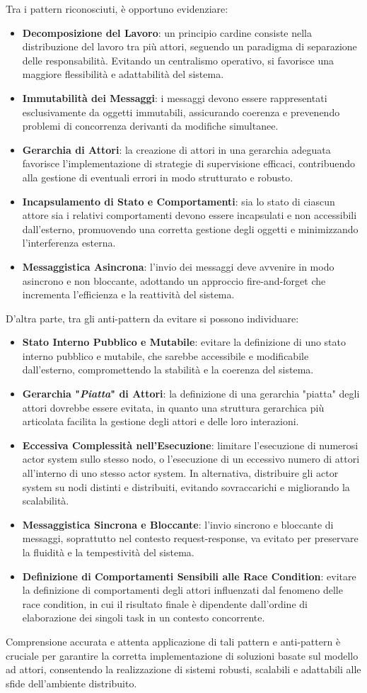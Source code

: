 Tra i pattern riconosciuti, è opportuno evidenziare:
\begin{itemize}
  \item \textbf{Decomposizione del Lavoro}: un principio cardine consiste nella distribuzione del lavoro tra più attori, seguendo un paradigma di separazione delle responsabilità. Evitando un centralismo operativo, si favorisce una maggiore flessibilità e adattabilità del sistema.
  \item \textbf{Immutabilità dei Messaggi}: i messaggi devono essere rappresentati esclusivamente da oggetti immutabili, assicurando coerenza e prevenendo problemi di concorrenza derivanti da modifiche simultanee.
  \item \textbf{Gerarchia di Attori}: la creazione di attori in una gerarchia adeguata favorisce l'implementazione di strategie di supervisione efficaci, contribuendo alla gestione di eventuali errori in modo strutturato e robusto.
  \item \textbf{Incapsulamento di Stato e Comportamenti}: sia lo stato di ciascun attore sia i relativi comportamenti devono essere incapsulati e non accessibili dall'esterno, promuovendo una corretta gestione degli oggetti e minimizzando l'interferenza esterna.
  \item \textbf{Messaggistica Asincrona}: l'invio dei messaggi deve avvenire in modo asincrono e non bloccante, adottando un approccio fire-and-forget che incrementa l'efficienza e la reattività del sistema.
\end{itemize}

D'altra parte, tra gli anti-pattern da evitare si possono individuare:
\begin{itemize}
  \item \textbf{Stato Interno Pubblico e Mutabile}: evitare la definizione di uno stato interno pubblico e mutabile, che sarebbe accessibile e modificabile dall'esterno, compromettendo la stabilità e la coerenza del sistema.
  \item \textbf{Gerarchia "\textit{Piatta}" di Attori}: la definizione di una gerarchia "piatta" degli attori dovrebbe essere evitata, in quanto una struttura gerarchica più articolata facilita la gestione degli attori e delle loro interazioni.
  \item \textbf{Eccessiva Complessità nell'Esecuzione}: limitare l'esecuzione di numerosi actor system sullo stesso nodo, o l'esecuzione di un eccessivo numero di attori all'interno di uno stesso actor system. In alternativa, distribuire gli actor system su nodi distinti e distribuiti, evitando sovraccarichi e migliorando la scalabilità.
  \item \textbf{Messaggistica Sincrona e Bloccante}: l'invio sincrono e bloccante di messaggi, soprattutto nel contesto request-response, va evitato per preservare la fluidità e la tempestività del sistema.
  \item \textbf{Definizione di Comportamenti Sensibili alle Race Condition}: evitare la definizione di comportamenti degli attori influenzati dal fenomeno delle race condition, in cui il risultato finale è dipendente dall'ordine di elaborazione dei singoli task in un contesto concorrente.
\end{itemize}

Comprensione accurata e attenta applicazione di tali pattern e anti-pattern è cruciale per garantire la corretta implementazione di soluzioni basate sul modello ad attori, consentendo la realizzazione di sistemi robusti, scalabili e adattabili alle sfide dell'ambiente distribuito.